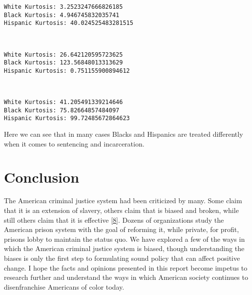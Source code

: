 \documentclass[11pt]{article}
\begin{document}
    \begin{Verbatim}[commandchars=\\\{\}]
White Kurtosis: 3.2523247666826185
Black Kurtosis: 4.946745832035741
Hispanic Kurtosis: 40.024525483281515

    \end{Verbatim}

    \begin{center}
    \end{center}
    { \hspace*{\fill} \\}
    
    \begin{Verbatim}[commandchars=\\\{\}]
White Kurtosis: 26.642120595723625
Black Kurtosis: 123.56848013313629
Hispanic Kurtosis: 0.751155900894612

    \end{Verbatim}

    \begin{center}
    \end{center}
    { \hspace*{\fill} \\}
    
    \begin{Verbatim}[commandchars=\\\{\}]
White Kurtosis: 41.205491339214646
Black Kurtosis: 75.82664857484097
Hispanic Kurtosis: 99.72485672864623

    \end{Verbatim}

    Here we can see that in many cases Blacks and Hispanics are treated
differently when it comes to sentencing and incarceration.

    \hypertarget{conclusion}{%
\section{Conclusion}\label{conclusion}}

The American criminal justice system had been criticized by many. Some
claim that it is an extension of slavery, others claim that is biased
and broken, while still others claim that it is effective
{[}\href{https://museumandmemorial.eji.org/museum}{8}{]}. Dozens of
organizations study the American prison system with the goal of
reforming it, while private, for profit, prisons lobby to maintain the
status quo. We have explored a few of the ways in which the American
criminal justice system is biased, though understanding the biases is
only the first step to formulating sound policy that can affect positive
change. I hope the facts and opinions presented in this report become
impetus to research further and understand the ways in which American
society continues to disenfranchise Americans of color today.


    
    
    
    
\end{document}
